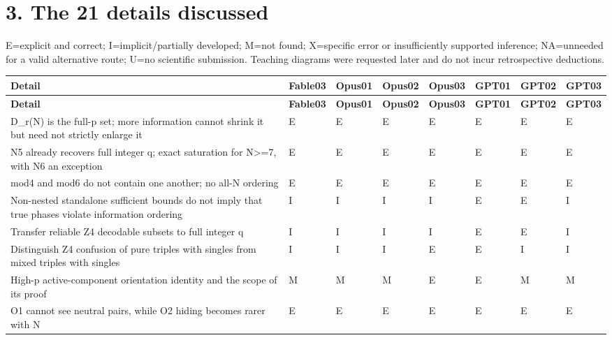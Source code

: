 \documentclass[11pt,a4paper]{article}
\renewcommand{\arraystretch}{1.18}
\begin{document}
\section*{3. The 21 details discussed}

E=explicit and correct; I=implicit/\allowbreak{}partially developed; M=not found; X=specific error or insufficiently supported inference; NA=unneeded for a valid alternative route; U=no scientific submission. Teaching diagrams were requested later and do not incur retrospective deductions.

{\fontsize{8.1}{11}\selectfont
\setlength{\tabcolsep}{2.2pt}
\renewcommand{\arraystretch}{1.05}
\begin{longtable}{>{\raggedright\arraybackslash}p{}>{\raggedright\arraybackslash}p{}>{\raggedright\arraybackslash}p{}>{\raggedright\arraybackslash}p{}>{\raggedright\arraybackslash}p{}>{\raggedright\arraybackslash}p{}>{\raggedright\arraybackslash}p{}>{\raggedright\arraybackslash}p{}}
\toprule
\textbf{Detail} & \textbf{Fable03} & \textbf{Opus01} & \textbf{Opus02} & \textbf{Opus03} & \textbf{GPT01} & \textbf{GPT02} & \textbf{GPT03}\tabularnewline
\midrule
\endfirsthead
\toprule
\textbf{Detail} & \textbf{Fable03} & \textbf{Opus01} & \textbf{Opus02} & \textbf{Opus03} & \textbf{GPT01} & \textbf{GPT02} & \textbf{GPT03}\tabularnewline
\midrule
\endhead
{}D\_r(N) is the full-p set; more information cannot shrink it but need not strictly enlarge it & E & E & E & E & E & E & E\tabularnewline
{}N5 already recovers full integer q; exact saturation for N>=7, with N6 an exception & E & E & E & E & E & E & E\tabularnewline
{}mod4 and mod6 do not contain one another; no all-N ordering & E & E & E & E & E & E & E\tabularnewline
{}Non-nested standalone sufficient bounds do not imply that true phases violate information ordering & I & I & I & I & E & E & I\tabularnewline
{}Transfer reliable Z4 decodable subsets to full integer q & I & I & I & I & E & E & I\tabularnewline
{}Distinguish Z4 confusion of pure triples with singles from mixed triples with singles & I & I & I & E & E & I & I\tabularnewline
{}High-p active-component orientation identity and the scope of its proof & M & M & M & E & E & M & M\tabularnewline
{}O1 cannot see neutral pairs, while O2 hiding becomes rarer with N & E & E & E & E & E & E & E\tabularnewline

\end{longtable}}
\end{document}
